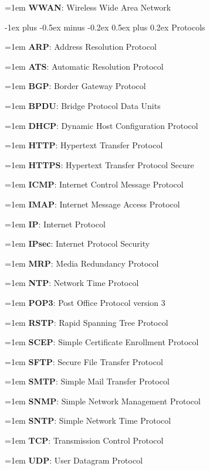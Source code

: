 \documentclass[letterpaper,8pt]{extarticle}
\makeatletter
\newcommand{\definition}[2]{
  \hangindent=1em
  \textbf{#1}: #2%
}
\renewcommand{\subsection}{\@startsection{subsection}{2}{0mm}%
  {-1ex plus -0.5ex minus -0.2ex}%
  {0.5ex plus 0.2ex}%
{\color{h2}\normalfont\fontsize{6}{6}\selectfont\bfseries}}
\makeatother
\begin{document}
\begin{multicols*}{5}
\begin{multicols*}{2}
    \definition{WWAN}{Wireless Wide Area Network}

  \end{multicols*}

  \subsection{Protocols}

  \begin{multicols*}{2}

    \definition{ARP}{Address Resolution Protocol}

    \definition{ATS}{Automatic Resolution Protocol}

    \definition{BGP}{Border Gateway Protocol}

    \definition{BPDU}{Bridge Protocol Data Units}

    \definition{DHCP}{Dynamic Host Configuration Protocol}

    \definition{HTTP}{Hypertext Transfer Protocol}

    \definition{HTTPS}{Hypertext Transfer Protocol Secure}

    \definition{ICMP}{Internet Control Message Protocol}

    \definition{IMAP}{Internet Message Access Protocol}

    \definition{IP}{Internet Protocol}

    \definition{IPsec}{Internet Protocol Security}

    \definition{MRP}{Media Redundancy Protocol}

    \definition{NTP}{Network Time Protocol}

    \definition{POP3}{Post Office Protocol version 3}

    \definition{RSTP}{Rapid Spanning Tree Protocol}

    \definition{SCEP}{Simple Certificate Enrollment Protocol}

    \definition{SFTP}{Secure File Transfer Protocol}

    \definition{SMTP}{Simple Mail Transfer Protocol}

    \definition{SNMP}{Simple Network Management Protocol}

    \definition{SNTP}{Simple Network Time Protocol}

    \definition{TCP}{Transmission Control Protocol}

    \definition{UDP}{User Datagram Protocol}

  \end{multicols*}


\end{multicols*}
\end{document}
